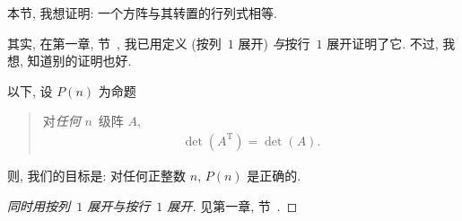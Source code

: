 本节, 我想证明: 一个方阵与其转置的行列式相等.

其实, 在第一章, 节~,
我已用定义 (按列~\(1\) 展开)
\emph{与}按行~\(1\) 展开证明了它.
不过, 我想, 知道别的证明也好.



以下, 设 \(P(n)\) 为命题
\begin{quotation}
    对\emph{任何} \(n\)~级阵 \(A\),
    \begin{align*}
        \det {(A^{\mathrm{T}})} = \det {(A)}.
    \end{align*}
\end{quotation}
则, 我们的目标是:
对任何正整数 \(n\), \(P(n)\) 是正确的.

\begin{proof}[同时用按列~\(1\) 展开与按行~\(1\) 展开]
    见第一章, 节~.
\end{proof}

